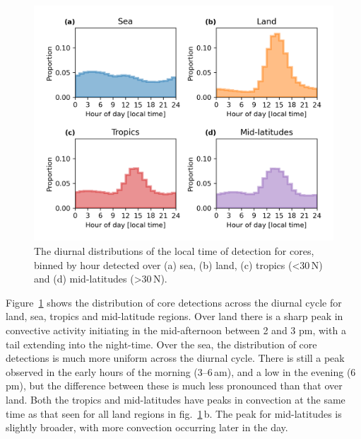 \begin{figure}[tp]
    \centering
    \includegraphics[width=\textwidth]{figures/chapter2_12.png}
    \caption[
    The diurnal distributions of the local time of detection for cores detected over land, sea, tropics and mid-latitudes
    ]{
    The diurnal distributions of the local time of detection for cores, binned by hour detected over (a) sea, (b) land, (c) tropics (\textless 30\,\textdegree N) and (d) mid-latitudes (\textgreater 30\,\textdegree N).
    }
    \label{fig:core_diurnal_land_sea}
\end{figure}


Figure~\ref{fig:core_diurnal_land_sea} shows the distribution of core detections across the diurnal cycle for land, sea, tropics and mid-latitude regions.
Over land there is a sharp peak in convective activity initiating in the mid-afternoon between 2 and 3 pm, with a tail extending into the night-time.
Over the sea, the distribution of core detections is much more uniform across the diurnal cycle.
There is still a peak observed in the early hours of the morning (3--6\,am), and a low in the evening (6\,pm), but the difference between these is much less pronounced than that over land.
Both the tropics and mid-latitudes have peaks in convection at the same time as that seen for all land regions in fig.~\ref{fig:core_diurnal_land_sea}\,b.
The peak for mid-latitudes is slightly broader, with more convection occurring later in the day.

